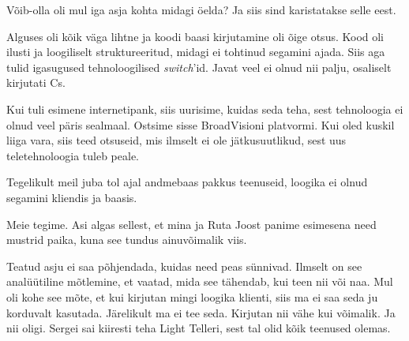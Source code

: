 
Võib-olla oli mul iga asja kohta midagi öelda? Ja siis sind karistatakse selle eest. 


Alguses oli kõik väga lihtne ja koodi baasi kirjutamine oli õige otsus. Kood oli ilusti ja loogiliselt
struktureeritud, midagi ei tohtinud segamini ajada. Siis aga tulid igasugused tehnoloogilised \emph{switch}'id. Javat veel ei olnud 
nii palju, osaliselt kirjutati Cs. 

Kui tuli esimene internetipank, siis 
uurisime, kuidas seda teha, sest tehnoloogia ei olnud veel päris sealmaal. Ostsime sisse BroadVisioni platvormi. Kui oled kuskil liiga vara, siis teed otsuseid, mis 
ilmselt ei ole jätkusuutlikud, sest uus teletehnoloogia tuleb peale. 


Tegelikult meil juba tol ajal andmebaas pakkus teenuseid, loogika ei olnud 
segamini kliendis ja baasis. 


Meie tegime. Asi algas sellest, et mina ja Ruta Joost 
panime esimesena need mustrid paika, kuna see tundus ainuvõimalik viis. 


Teatud asju ei saa põhjendada, kuidas need peas sünnivad. Ilmselt on see analüütiline mõtlemine, et vaatad, mida see tähendab, 
kui teen nii või naa. Mul oli kohe see mõte, et kui kirjutan 
mingi loogika klienti, siis ma ei saa seda ju korduvalt kasutada. Järelikult ma 
ei tee seda. Kirjutan nii vähe kui võimalik. Ja nii oligi. 
Sergei sai kiiresti teha Light Telleri, sest tal 
olid kõik teenused olemas. 

